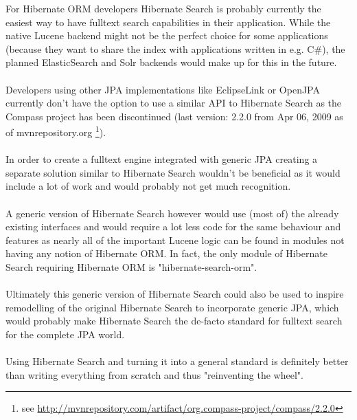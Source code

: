 For Hibernate ORM developers Hibernate Search is probably currently the easiest way to have fulltext search capabilities in their application. While the native Lucene backend might not be the perfect choice for some applications (because they want to share the index with applications written in e.g. C\#), the planned ElasticSearch and Solr backends would make up for this in the future.
\\\\
Developers using other JPA implementations like EclipseLink or OpenJPA currently don't have the option to use a similar API to Hibernate Search as the Compass project has been discontinued (last version: 2.2.0 from Apr 06, 2009 as of mvnrepository.org \footnote{see \url{http://mvnrepository.com/artifact/org.compass-project/compass/2.2.0}}).
\\\\
In order to create a fulltext engine integrated with generic JPA creating a separate solution similar to Hibernate Search wouldn't be beneficial as it would include a lot of work and would probably not get much recognition.
\\\\
A generic version of Hibernate Search however would use (most of) the already existing interfaces and would require a lot less code for the same behaviour and features as nearly all of the important Lucene logic can be found in modules not having any notion of Hibernate ORM. In fact, the only module of Hibernate Search requiring Hibernate ORM is "hibernate-search-orm".
\\\\
Ultimately this generic version of Hibernate Search could also be used to inspire remodelling of the original Hibernate Search to incorporate generic JPA, which would probably make Hibernate Search the de-facto standard for fulltext search for the complete JPA world.
\\\\
Using Hibernate Search and turning it into a general standard is definitely better than writing everything from scratch and thus "reinventing the wheel". \label{reinvent_the_wheel}

\pagebreak